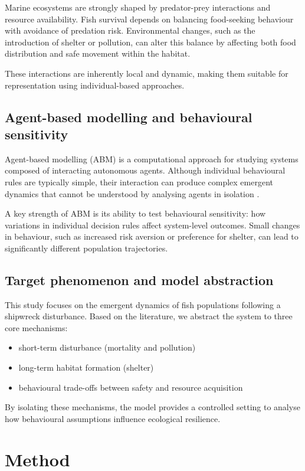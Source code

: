 \documentclass[10pt,a4paper,twocolumn]{article}
\begin{document}
Marine ecosystems are strongly shaped by predator-prey interactions and resource availability. Fish survival depends on balancing food-seeking behaviour with avoidance of predation risk. Environmental changes, such as the introduction of shelter or pollution, can alter this balance by affecting both food distribution and safe movement within the habitat.

These interactions are inherently local and dynamic, making them suitable for representation using individual-based approaches.

\subsection{Agent-based modelling and behavioural sensitivity}

Agent-based modelling (ABM) is a computational approach for studying systems composed of interacting autonomous agents. Although individual behavioural rules are typically simple, their interaction can produce complex emergent dynamics that cannot be understood by analysing agents in isolation \citep{ar:GallegatiEtAl2024}.

A key strength of ABM is its ability to test behavioural sensitivity: how variations in individual decision rules affect system-level outcomes. Small changes in behaviour, such as increased risk aversion or preference for shelter, can lead to significantly different population trajectories.

\subsection{Target phenomenon and model abstraction}

This study focuses on the emergent dynamics of fish populations following a shipwreck disturbance. Based on the literature, we abstract the system to three core mechanisms:
\begin{itemize}
    \item short-term disturbance (mortality and pollution)
    \item long-term habitat formation (shelter)
    \item behavioural trade-offs between safety and resource acquisition
\end{itemize}

By isolating these mechanisms, the model provides a controlled setting to analyse how behavioural assumptions influence ecological resilience.

\section{Method}
\end{document}
